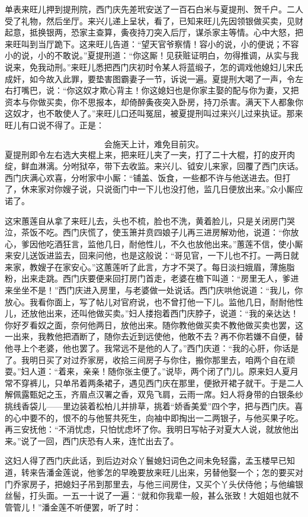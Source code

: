 单表来旺儿押到提刑院，西门庆先差玳安送了一百石白米与夏提刑、贺千户。二人受了礼物，然后坐厅。来兴儿递上呈状，看了，已知来旺儿先因领银做买卖，见财起意，抵换银两，恐家主查算，夤夜持刀突入后厅，谋杀家主等情。心中大怒，把来旺叫到当厅跪下。这来旺儿告道：“望天官爷察情！容小的说，小的便说；不容小的说，小的不敢说。”夏提刑道：“你这厮！见获赃证明白，勿得推调，从实与我说来，免我动刑。”来旺儿悉把西门庆初时令某人将蓝缎子，怎的调戏他媳妇儿宋氏成奸，如今故入此罪，要垫害图霸妻子一节，诉说一遍。夏提刑大喝了一声，令左右打嘴巴，说：“你这奴才欺心背主！你这媳妇也是你家主娶的配与你为妻，又把资本与你做买卖，你不思报本，却倚醉夤夜突入卧房，持刀杀害。满天下人都象你这奴才，也不敢使人了。”来旺儿口还叫冤屈，被夏提刑叫过来兴儿过来执证。那来旺儿有口说不得了。正是：

\[
会施天上计，难免目前灾。
\]
夏提刑即令左右选大夹棍上来，把来旺儿夹了一夹，打了二十大棍，打的皮开肉绽，鲜血淋漓。分咐狱卒，带下去收监。来兴儿、钺安儿来家，回覆了西门庆话。西门庆满心欢喜，分咐家中小厮：“铺盖、饭食，一些都不许与他送进去。但打了，休来家对你嫂子说，只说衙门中一下儿也没打他，监几日便放出来。”众小厮应诺了。

这宋蕙莲自从拿了来旺儿去，头也不梳，脸也不洗，黄着脸儿，只是关闭房门哭泣，茶饭不吃。西门庆慌了，使玉箫并贲四娘子儿再三进房解劝他，说道：“你放心，爹因他吃酒狂言，监他几日，耐他性儿，不久也放他出来。”蕙莲不信，使小厮来安儿送饭进监去，回来问他，也是这般说：“哥见官，一下儿也不打。一两日就来家，教嫂子在家安心。”这蕙莲听了此言，方才不哭了。每日淡扫娥眉，薄施脂粉，出来走跳。西门庆要便来回打房门首走，老婆在檐下叫道：“房里无人，爹进来坐坐不是！”西门庆进入房里，与老婆做一处说话。西门庆哄他说道：“我儿，你放心。我看你面上，写了帖儿对官府说，也不曾打他一下儿。监他几日，耐耐他性儿，还放他出来，还叫他做买卖。”妇人搂抱着西门庆脖子，说道：“我的亲达达！你好歹看奴之面，奈何他两日，放他出来。随你教他做买卖不教他做买卖也罢，这一出来，我教他把酒断了，随你去近到远使他，他敢不去？再不你若嫌不自便，替他寻上个老婆，他也罢了。我常远不是他的人了。”西门庆道：“我的心肝，你话是了。我明日买了对过乔家房，收拾三间房子与你住，搬你那里去，咱两个自在顽耍。”妇人道：“着来，亲亲！随你张主便了。”说毕，两个闭了门儿。原来妇人夏月常不穿裤儿，只单吊着两条裙子，遇见西门庆在那里，便掀开裙子就干。于是二人解佩露甄妃之玉，齐眉点汉署之香，双凫飞肩，云雨一席。妇人将身带的白银条纱挑线香袋儿——里边装着松柏儿并排草，挑着“娇香美爱”四个字，把与西门庆。喜的心中要不的，恨不的与他誓共死生，向袖中即掏出一二两银子，与他买果子吃。再三安抚他：“不消忧虑，只怕忧虑坏了你。我明日写帖子对夏大人说，就放他出来。”说了一回，西门庆恐有人来，连忙出去了。

这妇人得了西门庆此话，到后边对众丫鬟媳妇词色之间未免轻露，孟玉楼早已知道，转来告潘金莲说，他爹怎的早晚要放来旺儿出来，另替他娶一个；怎的要买对门乔家房子，把媳妇子吊到那里去，与他三间房住，又买个丫头伏侍他；与他编银丝髻，打头面。一五一十说了一遍：“就和你我辈一般，甚么张致！大姐姐也就不管管儿！”潘金莲不听便罢，听了时：

